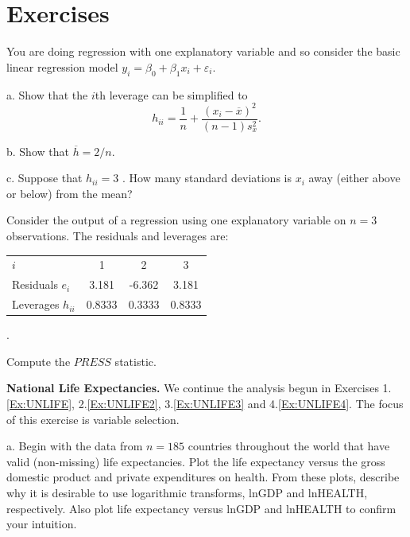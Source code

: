 \section{Exercises}


\begin{exercises}


\item  You are doing regression with one explanatory variable and so
consider the basic linear regression model $y_i = \beta_0 +  \beta_1
x_i + \varepsilon_i$.

a.  Show that the $i$th leverage can be simplified to
\begin{equation*}
h_{ii} = \frac{1}{n} + \frac{(x_i - \overline{x})^2}{(n-1) s_x^2}.
\end{equation*}

b.  Show that  $\overline{h}= 2 / n$.

c.  Suppose that $h_{ii} = 3$ . How many standard deviations is
$x_i$ away (either above or below) from the mean?

\item Consider the output of a regression using one explanatory
variable on $n=3$ observations. The residuals and leverages are:
\begin{tabular}{l|ccc}
\hline
$i$ & 1 & 2 & 3 \\
Residuals $e_i$ & 3.181 & -6.362 & 3.181 \\
Leverages $h_{ii}$ & 0.8333 & 0.3333 & 0.8333\\ \hline
\end{tabular}.

Compute the $PRESS$ statistic.


\item \textbf{National Life Expectancies.}\label{Ex:UNLIFE4} We
continue the analysis begun in Exercises 1.\ref{Ex:UNLIFE},
2.\ref{Ex:UNLIFE2}, 3.\ref{Ex:UNLIFE3} and 4.\ref{Ex:UNLIFE4}. The
focus of this exercise is variable selection.

a. Begin with the data from $n=185$ countries throughout the world
that have valid (non-missing) life expectancies. Plot the life
expectancy versus the gross domestic product and private
expenditures on health. From these plots, describe why it is
desirable to use logarithmic transforms, lnGDP and lnHEALTH,
respectively. Also plot life expectancy versus lnGDP and lnHEALTH to
confirm your intuition.


\end{exercises}
